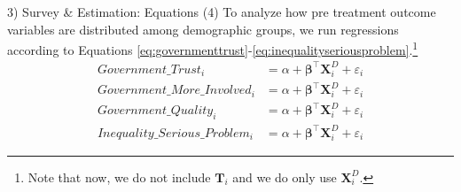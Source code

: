 \documentclass{beamer}
\begin{document}
\begin{frame}{3) Survey \& Estimation: Equations (4)} 
\label{equations4}
To analyze how pre treatment outcome variables are distributed among demographic groups, we run regressions according to Equations \ref{eq:governmenttrust}-\ref{eq:inequalityseriousproblem}.\footnote[9]{Note that now, we do not include $\mathbf{T}_i$ and we do only use $\mathbf{X}_i^{D}.$} 
\begin{align}
    \label{eq:governmenttrust}
    \text{$Government\_Trust_i$} 
        &= \alpha + \boldsymbol{\beta}^{\top}\mathbf{X}_i^{D} + \varepsilon_i
         \\
   \text{$Government\_More\_Involved_i$} 
        &= \alpha + \boldsymbol{\beta}^{\top}\mathbf{X}_i^{D} + \varepsilon_i \\
   \text{$Government\_Quality_i$} 
        &= \alpha + \boldsymbol{\beta}^{\top}\mathbf{X}_i^{D} + \varepsilon_i \\
    \label{eq:inequalityseriousproblem}
    \text{$Inequality\_Serious\_Problem_i$} 
        &= \alpha + \boldsymbol{\beta}^{\top}\mathbf{X}_i^{D} + \varepsilon_i 
\end{align}
\hfill \hyperlink{GovernmentViews}{} 
\end{frame}
\end{document}

